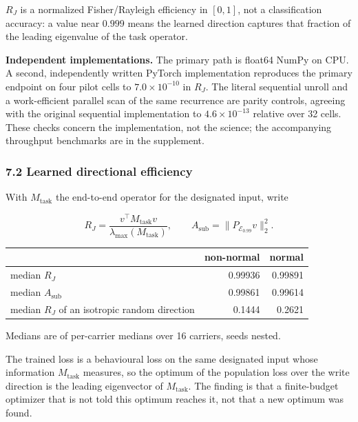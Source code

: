 \documentclass[
  10pt,
]{article}
\newcounter{none} %
\begin{document}
\(R_J\) is a normalized Fisher/Rayleigh efficiency in \([0,1]\), not a
classification accuracy: a value near \(0.999\) means the learned
direction captures that fraction of the leading eigenvalue of the task
operator.

\textbf{Independent implementations.} The primary path is float64 NumPy
on CPU. A second, independently written PyTorch implementation
reproduces the primary endpoint on four pilot cells to
\(7.0\times10^{-10}\) in \(R_J\). The literal sequential unroll and a
work-efficient parallel scan of the same recurrence are parity controls,
agreeing with the original sequential implementation to
\(4.6\times10^{-13}\) relative over 32 cells. These checks concern the
implementation, not the science; the accompanying throughput benchmarks
are in the supplement.

\subsubsection{7.2 Learned directional
efficiency}\label{learned-directional-efficiency}

With \(M_{\text{task}}\) the end-to-end operator for the designated
input, write

\[
R_J=\frac{v^\top M_{\text{task}}v}{\lambda_{\max}(M_{\text{task}})},
\qquad
A_{\text{sub}}=\bigl\lVert P_{\mathcal E_{0.99}}v\bigr\rVert_2^2 .
\]

{\def\LTcaptype{none} %
\begin{longtable}[]{@{}lrr@{}}
\toprule\noalign{}
& non-normal & normal \\
\midrule\noalign{}
\endhead
\bottomrule\noalign{}
\endlastfoot
median \(R_J\) & 0.99936 & 0.99891 \\
median \(A_{\text{sub}}\) & 0.99861 & 0.99614 \\
median \(R_J\) of an isotropic random direction & 0.1444 & 0.2621 \\
\end{longtable}
}

Medians are of per-carrier medians over 16 carriers, seeds nested.

The trained loss is a behavioural loss on the same designated input
whose information \(M_{\text{task}}\) measures, so the optimum of the
population loss over the write direction is the leading eigenvector of
\(M_{\text{task}}\). The finding is that a finite-budget optimizer that
is not told this optimum reaches it, not that a new optimum was found.
\end{document}
